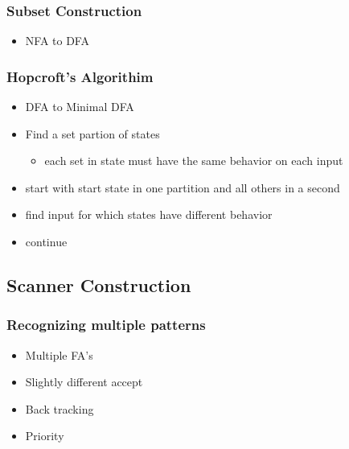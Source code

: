 \documentclass[usepdftitle=false,professionalfonts,compress ]{beamer}
\begin{document}
{
\begin{frame}\frametitle{Subset Construction}

	\begin{itemize}
	\item NFA to DFA
				\end{itemize}

\end{frame}}



{
\begin{frame}\frametitle{Hopcroft's Algorithim}

	\begin{itemize}
	\item DFA to Minimal DFA
			\item Find a set partion of states

	\begin{itemize}
	\item each set in state must have the same behavior on each input
				\end{itemize}

			\item start with start state in one partition and all others in a second
			\item find input for which states have different behavior
			\item continue
				\end{itemize}

\end{frame}}







\subsection{Scanner Construction}

{
\begin{frame}\frametitle{Recognizing multiple patterns}

	\begin{itemize}
	\item Multiple FA's
			\item Slightly different accept
			\item Back tracking
			\item Priority
				\end{itemize}

\end{frame}}
\end{document}

